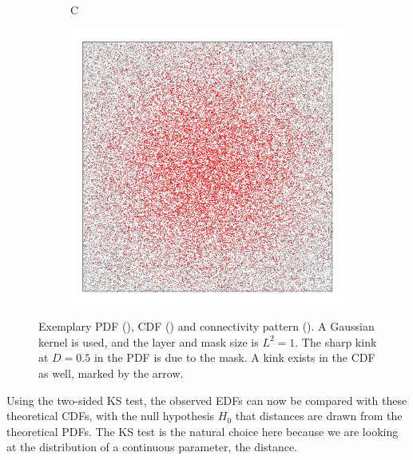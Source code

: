 \begin{figure}[ht]
\begin{subfigure}[b]{0.49\textwidth}
\end{subfigure}
\begin{subfigure}[b]{0.49\textwidth}
	  \begin{flushleft}
	  \large C
		\end{flushleft}
    \centering
    \includegraphics[width=\textwidth]{Gaussian1_network.png}
    \label{subfig:gaussian_network}
\end{subfigure}
\caption[Exemplary PDF, CDF and connectivity pattern for a network in 2D space, using a Gaussian kernel]{Exemplary PDF (), CDF () and connectivity pattern (). A Gaussian kernel is used, and the layer and mask size is $L^2 = 1$. The sharp kink at $D = 0.5$ in the PDF is due to the mask. A kink exists in the CDF as well, marked by the arrow.}
\label{fig:2Dex}
\end{figure}

Using the two-sided KS test, the observed EDFs can now be compared with these theoretical CDFs, with the null hypothesis $H_0$ that distances are drawn from the theoretical PDFs. The KS test is the natural choice here because we are looking at the distribution of a continuous parameter, the distance.

